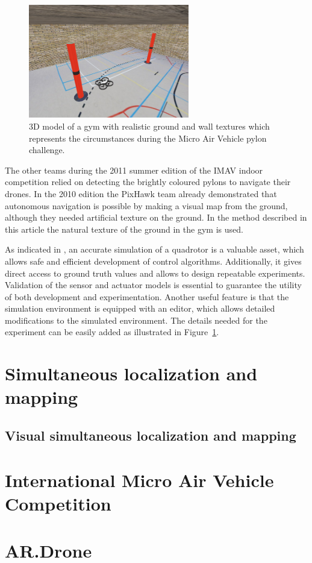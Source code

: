 \begin{figure}[htb]
\centering
\includegraphics[width=7cm]{images/AR-DroneInGym.jpg}
\caption{3D model of a gym with realistic ground and wall textures which represents the circumstances during the Micro Air Vehicle pylon challenge.}
\label{fig:AR.DroneInGym}
\end{figure}

The other teams during the 2011 summer edition of the IMAV indoor competition relied on detecting the brightly coloured pylons to navigate their drones. In the 2010 edition the PixHawk team \cite{Meier2011} already demonstrated that autonomous navigation is possible by making a visual map from the ground, although they needed artificial texture on the ground. In the method described in this article the natural texture of the ground in the gym is used.

As indicated in \cite{Michael2010ra}, an accurate simulation of a quadrotor is a valuable asset, which allows safe and efficient development of control algorithms. Additionally, it gives direct access to ground truth values and allows to design repeatable experiments.
Validation of the sensor and actuator models is essential to guarantee 
the utility of both development and experimentation. 
Another useful feature is that the simulation environment is equipped with an editor, which allows detailed modifications to the simulated environment. The details needed for the experiment can be easily added as illustrated in Figure~\ref{fig:AR.DroneInGym}.


	\section{Simultaneous localization and mapping}
		\subsection{Visual simultaneous localization and mapping}
	\section{International Micro Air Vehicle Competition}
	\section{AR.Drone}